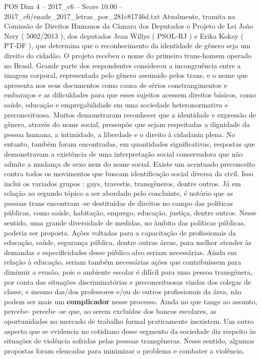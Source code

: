 \begin{textsample}{POS Dim 4 – 2017\_c6 – Score 10.00 – 2017\_c6/enade\_2017\_letras\_por\_281c81746d.txt}
Atualmente, tramita na Comissão de Direitos Humanos da Câmara dos Deputados o Projeto de Lei João Nery ( 5002/2013 ), dos deputados Jean Willys ( PSOL-RJ ) e Erika Kokay ( PT-DF ), que determina que o reconhecimento da identidade de gênero seja um direito do cidadão.
O projeto recebeu o nome do primeiro trans-homem operado no Brasil.
Grande parte dos respondentes considerou a incongruência entre a imagem corporal, representada pelo gênero assumido pelos trans, e o nome que apresenta nos seus documentos como causa de sérios constrangimentos e embaraços e as dificuldades para que esses sujeitos acessem direitos básicos, como saúde, educação e empregabilidade em uma sociedade heteronormativa e preconceituosa.
Muitos demonstraram reconhecer que a identidade e expressão de gênero, através do nome social, pressupõe que sejam respeitadas a dignidade da pessoa humana, a intimidade, a liberdade e o direito à cidadania plena.
No entanto, também foram encontradas, em quantidades significativas, respostas que demonstravam a existência de uma interpretação social conservadora que não admite a mudança de sexo nem do nome social.
Existe um acentuado preconceito contra todos os movimentos que buscam identificação social diversa da civil.
Isso inclui os variados grupos : gays, travestis, transgêneros, dentre outros.
Já em relação ao segundo tópico a ser abordado pelo concluinte, é notório que as pessoas trans encontram -se destituídas de direitos no campo das políticas públicas, como saúde, habitação, emprego, educação, justiça, dentre outros.
Nesse sentido, uma grande diversidade de medidas, no âmbito das políticas públicas, poderia ser proposta.
Ações voltadas para a capacitação de profissionais da educação, saúde, segurança pública, dentre outras áreas, para melhor atender às demandas e especificidades desse público alvo seriam necessárias.
Ainda em relação à educação, seriam também necessárias ações que contribuíssem para diminuir a evasão, pois o ambiente escolar é difícil para uma pessoa transgênera, por conta das situações discriminatórias e preconceituosas vindas dos colegas de classe, e mesmo das/dos professores e/ou de outros profissionais da área, não podem ser mais um \textbf{complicador} nesse processo.
Ainda no que tange ao assunto, percebe- percebe -se que, ao serem excluídas dos bancos escolares, as oportunidades no mercado de trabalho formal praticamente inexistem.
Um outro aspecto que se evidencia no cotidiano desse segmento da sociedade diz respeito às situações de violência sofridas pelas pessoas transgêneras.
Nesse sentido, algumas propostas foram elencadas para minimizar o problema e combater a violência.

\end{textsample}
